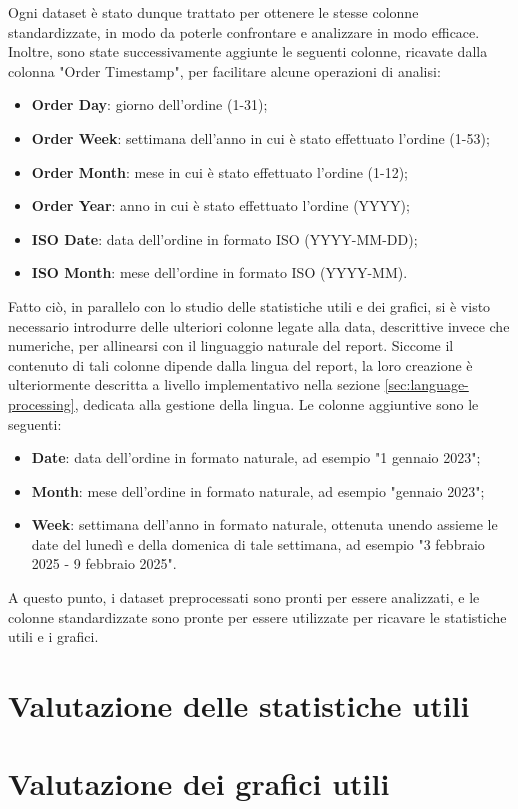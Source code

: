 Ogni dataset è stato dunque trattato per ottenere le stesse colonne standardizzate, in modo da poterle confrontare e analizzare in modo efficace.
Inoltre, sono state successivamente aggiunte le seguenti colonne, ricavate dalla colonna "Order Timestamp", per facilitare alcune operazioni di analisi:
\begin{itemize}
    \item \textbf{Order Day}: giorno dell'ordine (1-31);
    \item \textbf{Order Week}: settimana dell'anno in cui è stato effettuato l'ordine (1-53);
    \item \textbf{Order Month}: mese in cui è stato effettuato l'ordine (1-12);
    \item \textbf{Order Year}: anno in cui è stato effettuato l'ordine (YYYY);
    \item \textbf{ISO Date}: data dell'ordine in formato ISO (YYYY-MM-DD);
    \item \textbf{ISO Month}: mese dell'ordine in formato ISO (YYYY-MM).
\end{itemize}

Fatto ciò, in parallelo con lo studio delle statistiche utili e dei grafici, si è visto necessario introdurre delle ulteriori colonne legate alla data, descrittive invece che numeriche, per allinearsi con il linguaggio naturale del report. Siccome il contenuto di tali colonne dipende dalla lingua del report, la loro creazione è ulteriormente descritta a livello implementativo nella sezione \ref{sec:language-processing}, dedicata alla gestione della lingua. Le colonne aggiuntive sono le seguenti:
\begin{itemize}
    \item \textbf{Date}: data dell'ordine in formato naturale, ad esempio "1 gennaio 2023";
    \item \textbf{Month}: mese dell'ordine in formato naturale, ad esempio "gennaio 2023";
    \item \textbf{Week}: settimana dell'anno in formato naturale, ottenuta unendo assieme le date del lunedì e della domenica di tale settimana, ad esempio "3 febbraio 2025 - 9 febbraio 2025".
\end{itemize}

A questo punto, i dataset preprocessati sono pronti per essere analizzati, e le colonne standardizzate sono pronte per essere utilizzate per ricavare le statistiche utili e i grafici.


\section{Valutazione delle statistiche utili}

\section{Valutazione dei grafici utili}

